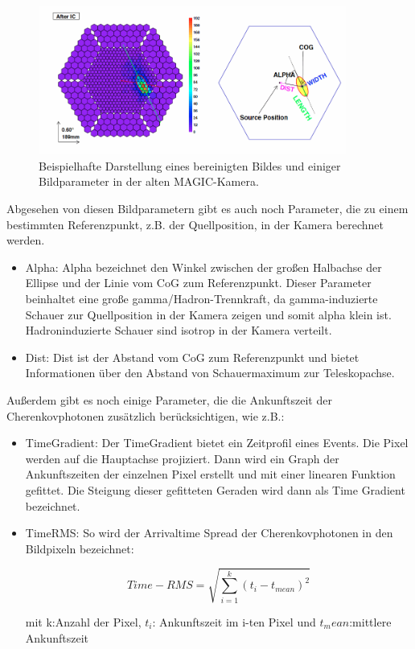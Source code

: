 \begin{figure}
    \centering
    \includegraphics[width=0.9\textwidth]{./Plots/CleaningBild.png}
    \caption{Beispielhafte Darstellung eines bereinigten Bildes und einiger Bildparameter in der alten MAGIC-Kamera.}
    \label{CleaningBild}
\end{figure}

Abgesehen von diesen Bildparametern gibt es auch noch Parameter, die zu einem bestimmten Referenzpunkt, z.B. der Quellposition, in der Kamera berechnet werden. 

\begin{itemize}
 \item Alpha: Alpha bezeichnet den Winkel zwischen der großen Halbachse der Ellipse und der Linie vom CoG zum Referenzpunkt.
 Dieser Parameter beinhaltet eine große gamma/Hadron-Trennkraft, da gamma-induzierte Schauer zur Quellposition in der Kamera zeigen und somit alpha klein ist.
 Hadroninduzierte Schauer sind isotrop in der Kamera verteilt.
 \item Dist: Dist ist der Abstand vom CoG zum Referenzpunkt und bietet Informationen über den Abstand von Schauermaximum zur Teleskopachse.
\end{itemize}

Außerdem gibt es noch einige Parameter, die die Ankunftszeit der Cherenkovphotonen zusätzlich berücksichtigen, wie z.B.:

\begin{itemize}
 \item TimeGradient: Der TimeGradient bietet ein Zeitprofil eines Events.
 Die Pixel werden auf die Hauptachse projiziert.
 Dann wird ein Graph der Ankunftszeiten der einzelnen Pixel erstellt und mit einer linearen Funktion gefittet.
 Die Steigung dieser gefitteten Geraden wird dann als Time Gradient bezeichnet.
 \item TimeRMS: So wird der Arrivaltime Spread der Cherenkovphotonen in den Bildpixeln bezeichnet:
 
\begin{equation}
 Time-RMS=\sqrt{\sum_{i=1}^k (t_i-t_{mean})^2}
\end{equation}
 \begin{centering}
  \tiny{mit k:Anzahl der Pixel, $t_i$: Ankunftszeit im i-ten Pixel und $t_mean$:mittlere Ankunftszeit}
 \end{centering}


\end{itemize}

